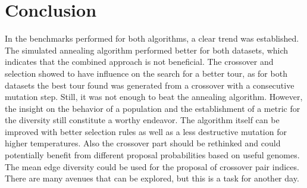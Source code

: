 \section{Conclusion}
In the benchmarks performed for both algorithms, a clear trend was established. 
The simulated annealing algorithm performed better for both datasets, which indicates that the combined approach is not beneficial.
The crossover and selection showed to have influence on the search for a better tour, as for both datasets the best tour found was generated from a crossover with a consecutive mutation step.
Still, it was not enough to beat the annealing algorithm.
However, the insight on the behavior of a population and the establishment of a metric for the diversity still constitute a worthy endeavor.
The algorithm itself can be improved with better selection rules as well as a less destructive mutation for higher temperatures. 
Also the crossover part should be rethinked and could potentially benefit from different proposal probabilities based on useful genomes. 
The mean edge diversity could be used for the proposal of crossover pair indices.
There are many avenues that can be explored, but this is a task for another day. 